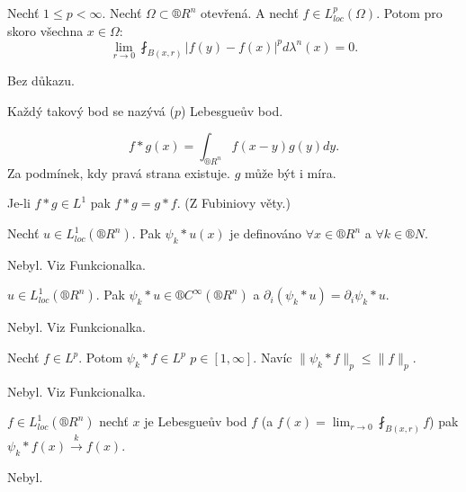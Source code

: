 \documentclass[12pt]{article}					%
\begin{document}
\begin{veta}
	Nechť $1 ≤ p < ∞$. Nechť $Ω \subset ®R^n$ otevřená. A nechť $f \in L^p_{loc}(Ω)$. Potom pro skoro všechna $x \in Ω$:
	$$ \lim_{r \rightarrow 0} \fint_{B(x, r)} |f(y) - f(x)|^p dλ^n(x) = 0. $$
	\vspace{-1em}

	\begin{dukazin}
		Bez důkazu.
	\end{dukazin}
\end{veta}

\begin{definice}
	Každý takový bod se nazývá ($p$) Lebesgueův bod.
\end{definice}

\begin{definice}[Konvoluce]
	$$ f*g(x) = \int_{®R^n} f(x - y)g(y) dy. $$
	Za podmínek, kdy pravá strana existuje. $g$ může být i míra.

	\begin{poznamka}
		Je-li $f * g \in L^1$ pak $f*g=g*f$. (Z Fubiniovy věty.)
	\end{poznamka}
\end{definice}

\begin{tvrzeni}
	Nechť $u \in L^1_{loc}(®R^n)$. Pak $ψ_k*u(x)$ je definováno $\forall x \in ®R^n$ a $\forall k \in ®N$.

	\begin{dukazin}
		Nebyl. Viz Funkcionalka.
	\end{dukazin}
\end{tvrzeni}

\begin{veta}
	$u \in L^1_{loc}(®R^n)$. Pak $ψ_k * u \in ®C^∞(®R^n)$ a $\partial_i(ψ_k*u) = \partial_iψ_k*u$.

	\begin{dukazin}
		Nebyl. Viz Funkcionalka.
	\end{dukazin}
\end{veta}

\begin{lemma}
	Nechť $f \in L^p$. Potom $ψ_k * f \in L^p$ $p \in [1, ∞]$. Navíc $\|ψ_k*f\|_p ≤ \|f\|_p$.

	\begin{dukazin}
		Nebyl. Viz Funkcionalka.
	\end{dukazin}
\end{lemma}

\begin{veta}
	$f \in L^1_{loc}(®R^n)$ nechť $x$ je Lebesgueův bod $f$ (a $f(x) = \lim_{r \rightarrow 0} \fint_{B(x, r)} f$) pak $ψ_k * f(x) \overset{k} \rightarrow f(x)$.

	\begin{dukazin}
		Nebyl.
	\end{dukazin}
\end{veta}
\end{document}
